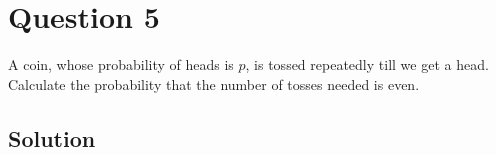 \section*{Question 5}

A coin, whose probability of heads is \( p \), is tossed repeatedly till we get a head.
Calculate the probability that the number of tosses needed is even.

\subsection*{Solution}
